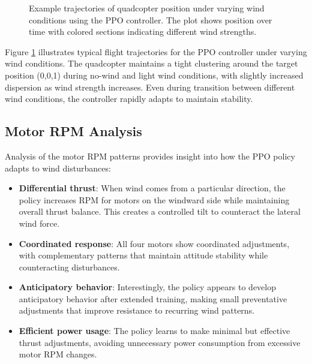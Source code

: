 \documentclass[12pt]{article}
\begin{document}
\begin{figure}[htbp]
\centering
\caption{Example trajectories of quadcopter position under varying wind conditions using the PPO controller. The plot shows position over time with colored sections indicating different wind strengths.}
\label{fig:trajectories}
\end{figure}


Figure \ref{fig:trajectories} illustrates typical flight trajectories for the PPO controller under varying wind conditions. The quadcopter maintains a tight clustering around the target position (0,0,1) during no-wind and light wind conditions, with slightly increased dispersion as wind strength increases. Even during transition between different wind conditions, the controller rapidly adapts to maintain stability.


\subsection{Motor RPM Analysis}

Analysis of the motor RPM patterns provides insight into how the PPO policy adapts to wind disturbances:


\begin{itemize}
    \item \textbf{Differential thrust}: When wind comes from a particular direction, the policy increases RPM for motors on the windward side while maintaining overall thrust balance. This creates a controlled tilt to counteract the lateral wind force.
    
    \item \textbf{Coordinated response}: All four motors show coordinated adjustments, with complementary patterns that maintain attitude stability while counteracting disturbances.
    
    \item \textbf{Anticipatory behavior}: Interestingly, the policy appears to develop anticipatory behavior after extended training, making small preventative adjustments that improve resistance to recurring wind patterns.
    
    \item \textbf{Efficient power usage}: The policy learns to make minimal but effective thrust adjustments, avoiding unnecessary power consumption from excessive motor RPM changes.
\end{itemize}
\end{document}
